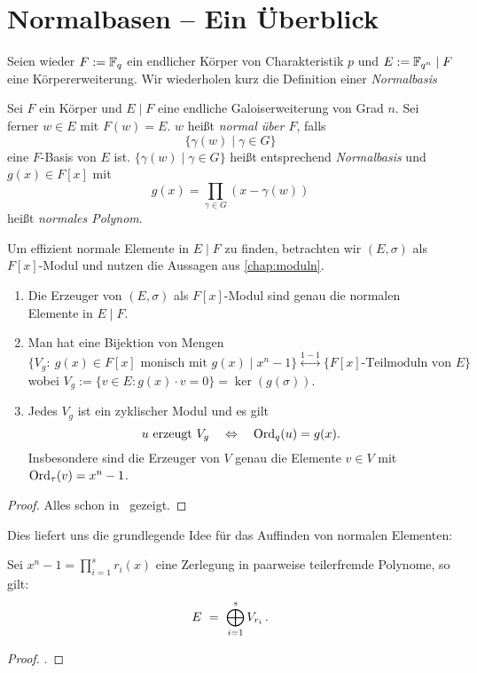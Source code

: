 \chapter{Normalbasen -- Ein Überblick}

Seien wieder $F := \mathbb{F}_q$ ein endlicher Körper von Charakteristik $p$ und 
$E := \mathbb{F}_{q^n} \mid F$ eine Körpererweiterung.
Wir wiederholen kurz die Definition einer \emph{Normalbasis}

\begin{definition}
  Sei $F$ ein Körper und $E \mid F$ eine endliche Galoiserweiterung von Grad
  $n$. Sei ferner $w\in E$ mit $F(w) = E$. $w$ heißt \emph{normal über $F$},
  falls
  \[ \{ \gamma(w) \mid \gamma \in G\}\]
  eine $F$-Basis von $E$ ist. 
  $\{ \gamma(w) \mid \gamma \in G\}$ heißt entsprechend \emph{Normalbasis} und
  $g(x) \in F[x]$ mit 
  \[ g(x) = \prod_{\gamma \in G}(x - \gamma(w))\]
  heißt \emph{normales Polynom}.
\end{definition}

Um effizient normale Elemente in $E\mid F$ zu finden, betrachten wir 
$(E,\sigma)$ als $F[x]$-Modul und nutzen die Aussagen aus
\autoref{chap:moduln}.

\begin{satz}
  \begin{enumerate}
    \item Die Erzeuger von $(E,\sigma)$ als $F[x]$-Modul sind genau die 
      normalen Elemente in $E\mid F$.
    \item Man hat eine Bijektion von Mengen
      \[ \{V_g :\ g(x) \in F[x] \text{ monisch mit } g(x) \mid x^n-1\}
        \overset{1-1}{\longleftrightarrow}
        \{F[x] \text{-Teilmoduln von }E\}\]
        wobei $V_g := \{v \in E : g(x)\cdot v = 0\} = \ker(g(\sigma))$.
    \item Jedes $V_g$ ist ein zyklischer Modul und es gilt
      \[u \text{ erzeugt } V_g \quad\Leftrightarrow \quad
        \operatorname{Ord}_q(u) = g(x).\]
        Insbesondere sind die Erzeuger von $V$ genau die Elemente $v \in V$ mit 
        $\operatorname{Ord}_\tau(v) = x^n-1$.
  \end{enumerate}
\end{satz}
\begin{proof}
  Alles schon in \TODO~gezeigt.
\end{proof}

Dies liefert uns die grundlegende Idee für das Auffinden von normalen
Elementen:
\begin{lemma}
  Sei $x^n-1 = \prod_{i=1}^s r_i(x)$ eine Zerlegung in paarweise teilerfremde
  Polynome, so gilt:
  \[ E \ =\  \bigoplus_{i=1}^s V_{r_i} \,.\]
\end{lemma}
\begin{proof}
  \TODO.
\end{proof}

